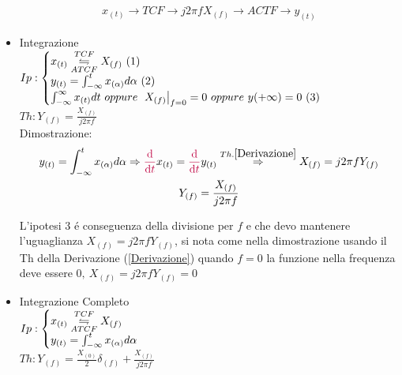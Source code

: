 \begin{itemize}
{                    \begin{gather}
                        x_{(t)} \rightarrow TCF \rightarrow j2\pi fX_{(f)} \rightarrow ACTF \rightarrow y_{(t)}\nonumber
                    \end{gather}
                }
                \item{Integrazione\\
                    $Ip:\begin{cases}
                        x_{(t)} \overunderset{TCF}{ATCF}{\leftrightharpoons} X_{(f)}\ (1)\\
                        y_{(t)} = \int_{-\infty}^{t} x_{(\alpha)} d\alpha\ (2) \\
                        \int_{-\infty}^{\infty} x_{(t)} dt\ oppure\ \eval*{X_{(f)}}_{f=0} = 0 \ oppure\ y{(+\infty)} = 0\ (3) \\
                    \end{cases}$\\
                    $Th: Y_{(f)} =\frac{X_{(f)}}{j2\pi f}$ \\
                    Dimostrazione:\\
                    \begin{gather}
                        y_{(t)} = \int_{-\infty}^{t} x_{(\alpha)} d\alpha \Rightarrow {\color{purple}\derivative{}{t}} x_{(t)} = {\color{purple}\derivative{}{t}} y_{(t)} \overset{Th. \ref{Derivazione}}{\Rightarrow}  X_{(f)} = j2\pi f Y_{(f)} \nonumber\\
                                Y_{(f)} =\frac{X_{(f)}}{j2\pi f}\nonumber
                    \end{gather}
        
                    L'ipotesi 3 é conseguenza della divisione per $f$ e che devo mantenere l'uguaglianza $X_{(f)} = j2\pi f Y_{(f)}$, si nota come nella dimostrazione usando il Th della Derivazione (\ref{Derivazione})
                    quando $f=0$ la funzione nella frequenza deve essere $0,\ X_{(f)} = j2\pi f Y_{(f)} = 0$ 
                
                }
                \item{Integrazione Completo\\
                    $Ip:\begin{cases}
                        x_{(t)} \overunderset{TCF}{ATCF}{\leftrightharpoons} X_{(f)}\\
                        y_{(t)} = \int_{-\infty}^{t} x_{(\alpha)} d\alpha
                    \end{cases}$\\
                    $Th: Y_{(f)} =\frac{X_{(0)}}{2}\delta_{(f)} +\frac{X_{(f)}}{j2\pi f}$ \\
                    
}
\end{itemize}
